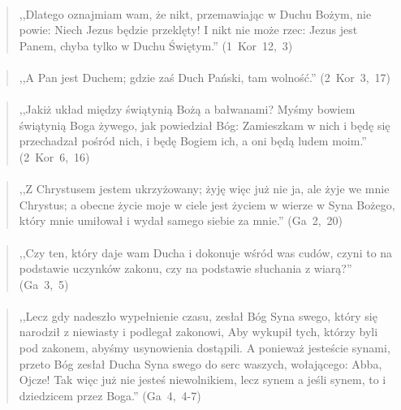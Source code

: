 \documentclass[10pt,a4paper,oneside]{article}
\begin{document}
\paragraph{}
\begin{quote}
,,Dlatego oznajmiam wam, że nikt, przemawiając w Duchu Bożym, nie powie: Niech Jezus będzie przeklęty! I nikt nie może rzec: Jezus jest Panem, chyba tylko w Duchu Świętym.'' \mbox{(1 Kor 12, 3)}
\end{quote}
\paragraph{}
\begin{quote}
,,A Pan jest Duchem; gdzie zaś Duch Pański, tam wolność.'' \mbox{(2 Kor 3, 17)}
\end{quote}
\paragraph{}
\begin{quote}
,,Jakiż układ między świątynią Bożą a bałwanami? Myśmy bowiem świątynią Boga żywego, jak powiedział Bóg: Zamieszkam w nich i będę się przechadzał pośród nich, i będę Bogiem ich, a oni będą ludem moim.'' \mbox{(2 Kor 6, 16)}
\end{quote}
\paragraph{}
\begin{quote}
,,Z Chrystusem jestem ukrzyżowany; żyję więc już nie ja, ale żyje we mnie Chrystus; a obecne życie moje w ciele jest życiem w wierze w Syna Bożego, który mnie umiłował i wydał samego siebie za mnie.'' \mbox{(Ga 2, 20)}
\end{quote}
\paragraph{}
\begin{quote}
,,Czy ten, który daje wam Ducha i dokonuje wśród was cudów, czyni to na podstawie uczynków zakonu, czy na podstawie słuchania z wiarą?'' \mbox{(Ga 3, 5)}
\end{quote}
\paragraph{}
\begin{quote}
,,Lecz gdy nadeszło wypełnienie czasu, zesłał Bóg Syna swego, który się narodził z niewiasty i podlegał zakonowi, Aby wykupił tych, którzy byli pod zakonem, abyśmy usynowienia dostąpili. A ponieważ jesteście synami, przeto Bóg zesłał Ducha Syna swego do serc waszych, wołającego: Abba, Ojcze! Tak więc już nie jesteś niewolnikiem, lecz synem a jeśli synem, to i dziedzicem przez Boga.'' \mbox{(Ga 4, 4-7)}
\end{quote}
\end{document}
